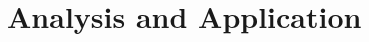 \documentclass[twoside]{report}
\begin{document}

\section{Analysis and Application}
\end{document}
